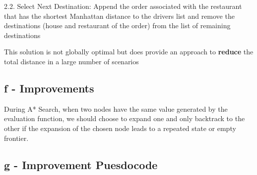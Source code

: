 \documentclass{article}
\begin{document}
2.2. Select Next Destination: Append the order associated with the restaurant that has the shortest Manhattan distance to the drivers list and remove the destinations (house and restaurant of the order) from the list of remaining destinations

This solution is not globally optimal but does provide an approach to \textbf{reduce} the total distance in a large number of scenarios

\subsection{f - Improvements}

During A* Search, when two nodes have the same value generated by the evaluation function, we should choose to expand one and only backtrack to the other if the expansion of the chosen node leads to a repeated state or empty frontier. 

\subsection{g - Improvement Puesdocode}
\end{document}
